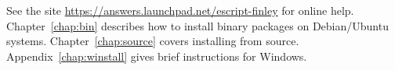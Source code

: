 See the site \url{https://answers.launchpad.net/escript-finley} for online help.
Chapter~\ref{chap:bin} describes how to install binary packages on Debian/Ubuntu systems.
Chapter~\ref{chap:source} covers installing from source.
Appendix~\ref{chap:winstall} gives brief instructions for Windows.


% 

